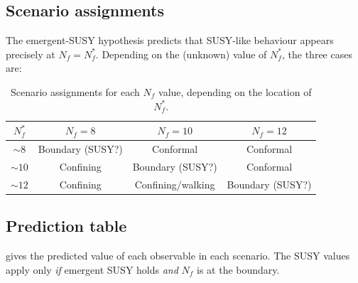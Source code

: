 \documentclass[11pt,a4paper]{article}
\theoremstyle{plain}
\theoremstyle{definition}
\theoremstyle{remark}
\newcommand{\Nf}{N_{\!f}}
\newcommand{\Nfstar}{\Nf^*}
\begin{document}
\subsection{Scenario assignments}

The emergent-SUSY hypothesis predicts that SUSY-like behaviour appears
precisely at $\Nf = \Nfstar$.  Depending on the (unknown) value of
$\Nfstar$, the three cases are:

\begin{table}[ht]
\centering
\renewcommand{\arraystretch}{1.3}
\caption{Scenario assignments for each $\Nf$ value, depending on the
  location of $\Nfstar$.}
\label{tab:scenarios}
\begin{tabular}{@{} c c c c @{}}
\toprule
$\Nfstar$ & $\Nf = 8$ & $\Nf = 10$ & $\Nf = 12$ \\
\midrule
$\sim 8$  & Boundary (SUSY?) & Conformal & Conformal \\
$\sim 10$ & Confining & Boundary (SUSY?) & Conformal \\
$\sim 12$ & Confining & Confining/walking & Boundary (SUSY?) \\
\bottomrule
\end{tabular}
\end{table}

\subsection{Prediction table}

 gives the predicted value of each
observable in each scenario.  The SUSY values apply only
\emph{if} emergent SUSY holds \emph{and} $\Nf$ is at the
boundary.
\end{document}
